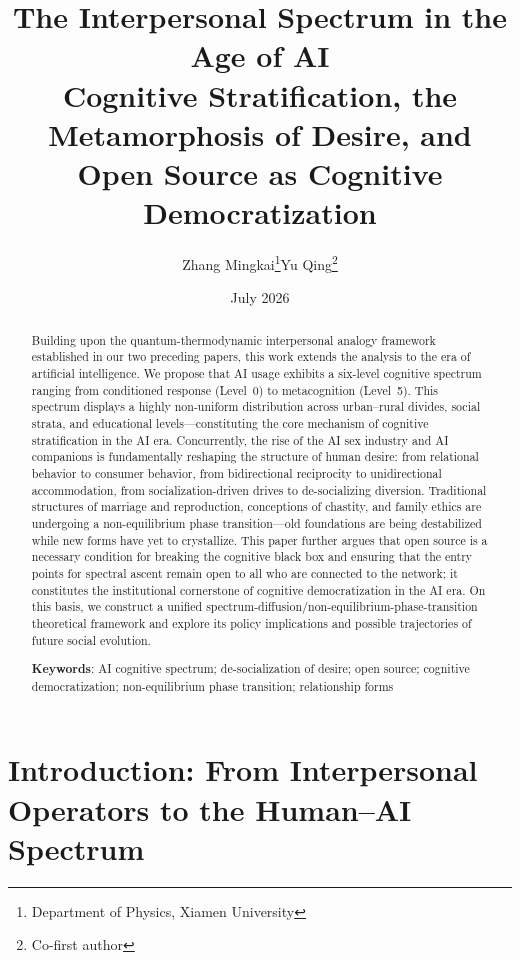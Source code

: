 ﻿\documentclass[12pt,a4paper]{article}
\title{\textbf{The Interpersonal Spectrum in the Age of AI}\\[4pt]
\large Cognitive Stratification, the Metamorphosis of Desire, and Open Source as Cognitive Democratization}
\author{Zhang Mingkai\thanks{Department of Physics, Xiamen University}\quad Yu Qing\thanks{Co-first author}}
\date{July 2026}
\begin{document}
\maketitle

\begin{abstract}
Building upon the quantum-thermodynamic interpersonal analogy framework established in our two preceding papers, this work extends the analysis to the era of artificial intelligence. We propose that AI usage exhibits a six-level cognitive spectrum ranging from conditioned response (Level~0) to metacognition (Level~5). This spectrum displays a highly non-uniform distribution across urban--rural divides, social strata, and educational levels---constituting the core mechanism of cognitive stratification in the AI era. Concurrently, the rise of the AI sex industry and AI companions is fundamentally reshaping the structure of human desire: from relational behavior to consumer behavior, from bidirectional reciprocity to unidirectional accommodation, from socialization-driven drives to de-socializing diversion. Traditional structures of marriage and reproduction, conceptions of chastity, and family ethics are undergoing a non-equilibrium phase transition---old foundations are being destabilized while new forms have yet to crystallize. This paper further argues that open source is a necessary condition for breaking the cognitive black box and ensuring that the entry points for spectral ascent remain open to all who are connected to the network; it constitutes the institutional cornerstone of cognitive democratization in the AI era. On this basis, we construct a unified spectrum-diffusion/non-equilibrium-phase-transition theoretical framework and explore its policy implications and possible trajectories of future social evolution.

\textbf{Keywords}: AI cognitive spectrum; de-socialization of desire; open source; cognitive democratization; non-equilibrium phase transition; relationship forms
\end{abstract}

\section{Introduction: From Interpersonal Operators to the Human--AI Spectrum}
\end{document}
